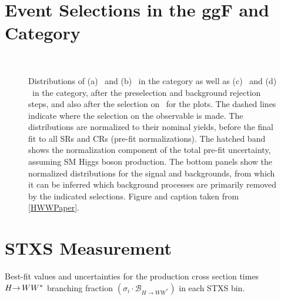 \FloatBarrier
\section{Event Selections in the ggF \ZeroJet and \OneJet Category}
\label{app:event-selection-ggf}

\begin{figure}[!h]
    \centering
     \\
  \caption{
  Distributions of (a) \mll\ and (b) \dphill\ in the \ZeroJet category as well as (c) \mll\ and (d) \dphill\ in the \OneJet category, after the preselection and background rejection steps, and also after the selection on \mll\ for the \dphill plots. The dashed lines indicate where the selection on the observable is made. The distributions are normalized to
  their nominal yields, before the final fit to all SRs and CRs (pre-fit normalizations). The hatched band shows the normalization component of the total pre-fit uncertainty, assuming SM Higgs boson production. The bottom panels show the normalized distributions for the signal and backgrounds, from which it can be inferred which background processes are primarily removed by the indicated selections.
  Figure and caption taken from \cref{HWWPaper}. 
  \label{fig:ggf:Plots:selections}
  }
  \end{figure}
  

\FloatBarrier
\section{STXS Measurement}
\label{app:stxs-measurement}
\begin{table}[htp]
    \caption{
    Best-fit values and uncertainties for the production cross section times $H{\rightarrow\,}WW^{\ast}$ branching fraction $({\sigma_i \cdot \mathcal{B}_{H \to WW^{\ast}}})$ in each STXS bin.
    }
    \begin{center}
      \small
      \renewcommand{\arraystretch}{1.5}
      \scalebox{0.90}{
        
      }
    \end{center}
    \label{tab:STXS-XSecs}
  \end{table}

